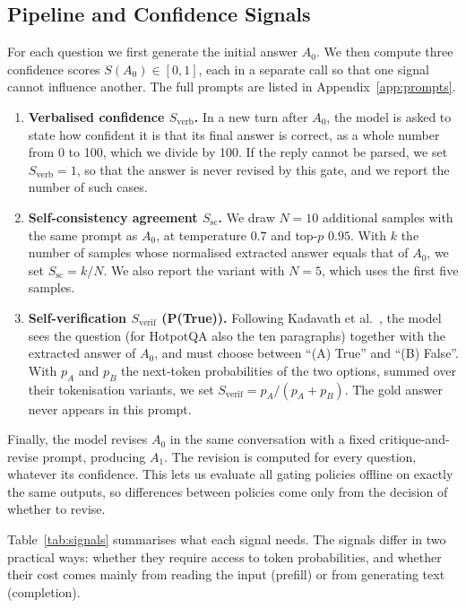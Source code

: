 \subsection{Pipeline and Confidence Signals}
For each question we first generate the initial answer $A_0$. We then compute three confidence scores $S(A_0)\in[0,1]$, each in a separate call so that one signal cannot influence another. The full prompts are listed in Appendix~\ref{app:prompts}.
\begin{enumerate}
    \item \textbf{Verbalised confidence $S_{\text{verb}}$.} In a new turn after $A_0$, the model is asked to state how confident it is that its final answer is correct, as a whole number from 0 to 100, which we divide by 100. If the reply cannot be parsed, we set $S_{\text{verb}}=1$, so that the answer is never revised by this gate, and we report the number of such cases.
    \item \textbf{Self-consistency agreement $S_{\text{sc}}$.} We draw $N=10$ additional samples with the same prompt as $A_0$, at temperature $0.7$ and top-$p$ $0.95$. With $k$ the number of samples whose normalised extracted answer equals that of $A_0$, we set $S_{\text{sc}}=k/N$. We also report the variant with $N=5$, which uses the first five samples.
    \item \textbf{Self-verification $S_{\text{verif}}$ (P(True)).} Following Kadavath et al.~\cite{kadavath2022language}, the model sees the question (for HotpotQA also the ten paragraphs) together with the extracted answer of $A_0$, and must choose between ``(A) True'' and ``(B) False''. With $p_A$ and $p_B$ the next-token probabilities of the two options, summed over their tokenisation variants, we set $S_{\text{verif}}=p_A/(p_A+p_B)$. The gold answer never appears in this prompt.
\end{enumerate}
Finally, the model revises $A_0$ in the same conversation with a fixed critique-and-revise prompt, producing $A_1$. The revision is computed for every question, whatever its confidence. This lets us evaluate all gating policies offline on exactly the same outputs, so differences between policies come only from the decision of whether to revise.

Table~\ref{tab:signals} summarises what each signal needs. The signals differ in two practical ways: whether they require access to token probabilities, and whether their cost comes mainly from reading the input (prefill) or from generating text (completion).

